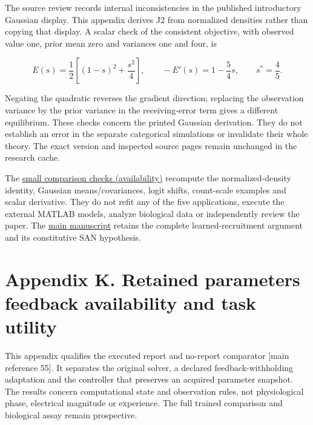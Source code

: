\documentclass[
  american,
  11pt,
  letterpaper,
]{article}
\begin{document}
The source review records internal inconsistencies in the published introductory Gaussian display. This appendix derives J2 from normalized densities rather than copying that display. A scalar check of the consistent objective, with observed value one, prior mean zero and variances one and four, is

\begin{equation}
E(s)=\frac12\left[(1-s)^2+\frac{s^2}{4}\right],\qquad
-E'(s)=1-\frac54s,\qquad s^*=\frac45.
\tag{J8}
\end{equation}

Negating the quadratic reverses the gradient direction; replacing the observation variance by the prior variance in the receiving-error term gives a different equilibrium. These checks concern the printed Gaussian derivation. They do not establish an error in the separate categorical simulations or invalidate their whole theory. The exact version and inspected source pages remain unchanged in the research cache.

The \href{https://github.com/v5ma/v5ma.github.io/blob/master/papers/companions/learning-to-feel-v1.0/ARTIFACT-AVAILABILITY.md\#artifact-33}{small comparison checks (availability)} recompute the normalized-density identity, Gaussian means/covariances, logit shifts, count-scale examples and scalar derivative. They do not refit any of the five applications, execute the external MATLAB models, analyze biological data or independently review the paper. The \href{https://zenodo.org/records/23455801/files/Learning-to-Feel-v1.1.pdf}{main manuscript} retains the complete learned-recruitment argument and its constitutive SAN hypothesis.

\clearpage
\hypertarget{appendix-k}{}

\section{Appendix K. Retained parameters feedback availability and task utility}\label{appendix-k.-retained-parameters-feedback-availability-and-task-utility}

This appendix qualifies the executed report and no-report comparator {[}main reference 55{]}. It separates the original solver, a declared feedback-withholding adaptation and the controller that preserves an acquired parameter snapshot. The results concern computational state and observation rules, not physiological phase, electrical magnitude or experience. The full trained comparison and biological assay remain prospective.
\end{document}
